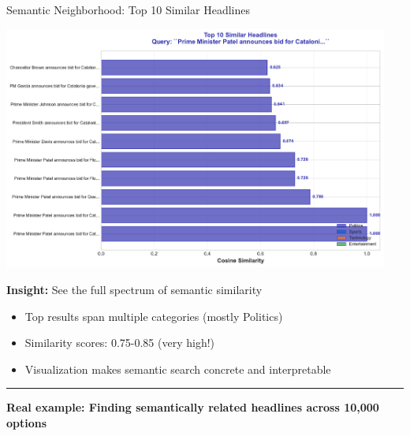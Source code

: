 \documentclass[8pt,aspectratio=169]{beamer}
\newcommand{\bottomnote}[1]{%
\vfill
\vspace{-2mm}
\textcolor{mllavender2}{\rule{\textwidth}{0.4pt}}
\vspace{1mm}
\footnotesize
\textbf{#1}
}
\begin{document}
\begin{frame}[t]{Semantic Neighborhood: Top 10 Similar Headlines}

\begin{center}
\includegraphics[width=0.95\textwidth,height=0.75\textheight]{charts/semantic_neighborhood.pdf}
\end{center}

\vspace{0.2cm}

\textbf{Insight:} See the full spectrum of semantic similarity

\begin{itemize}
    \item Top results span multiple categories (mostly Politics)
    \item Similarity scores: 0.75-0.85 (very high!)
    \item Visualization makes semantic search concrete and interpretable
\end{itemize}

\bottomnote{Real example: Finding semantically related headlines across 10,000 options}
\end{frame}
\end{document}
